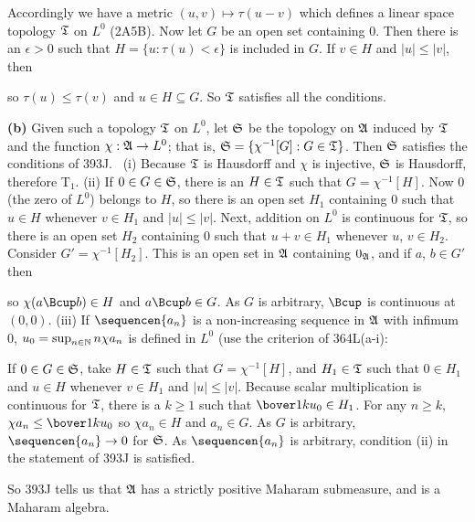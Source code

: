 {\medskip

 Accordingly we have a metric $(u,v)\mapsto\tau(u-v)$ which
defines a linear space topology $\frak T$ on $L^0$ (2A5B).   Now let $G$
be an open set containing $0$.   Then there is an $\epsilon>0$ such that
$H=\{u:\tau(u)<\epsilon\}$ is included in $G$.   If $v\in H$ and
$|u|\le|v|$, then


\noindent so $\tau(u)\le\tau(v)$ and $u\in H\subseteq G$.   So $\frak T$
satisfies all the conditions.

\medskip

{\bf (b)} Given such a topology $\frak T$ on $L^0$,
let $\frak S$ be the topology on $\frak A$ induced
by $\frak T$ and the function
$\chi:\frak A\to L^0$;  that is, $\frak S=\{\chi^{-1}[G]:G\in\frak T\}$.
Then $\frak S$ satisfies the conditions of 393J.   \Prf\ (i) Because
$\frak T$ is Hausdorff and $\chi$ is injective, $\frak S$ is Hausdorff,
therefore T$_1$.
(ii) If $0\in G\in\frak S$, there is an $H\in\frak T$ such that
$G=\chi^{-1}[H]$.   Now $0$ (the zero of $L^0$) belongs to $H$, so there
is an open set $H_1$ containing $0$ such that $u\in H$ whenever
$v\in H_1$ and $|u|\le|v|$.
Next, addition on $L^0$ is continuous for $\frak T$,
so there is an open set $H_2$ containing $0$ such that $u+v\in H_1$
whenever $u$, $v\in H_2$.   Consider $G'=\chi^{-1}[H_2]$.   This is an
open set in $\frak A$ containing $0_{\frak A}$, and if $a$, $b\in G'$ then


\noindent so $\chi(a\Bcup b)\in H$ and $a\Bcup b\in G$.   As $G$ is
arbitrary, $\Bcup$ is continuous at $(0,0)$.   (iii) If
$\sequencen{a_n}$ is
a non-increasing sequence in $\frak A$ with infimum $0$,
$u_0=\sup_{n\in\Bbb N}n\chi a_n$ is defined in $L^0$ (use the criterion
of 364L(a-i):


\noindent If $0\in G\in\frak S$, take $H\in\frak T$ such that
$G=\chi^{-1}[H]$, and $H_1\in\frak T$ such that $0\in H_1$ and $u\in H$
whenever $v\in H_1$ and $|u|\le|v|$.   Because scalar multiplication is
continuous for $\frak T$, there is a $k\ge 1$ such that
$\bover1ku_0\in H_1$.   For any $n\ge k$,
$\chi a_n\le\bover1ku_0$ so $\chi a_n\in H$
and $a_n\in G$.   As $G$ is arbitrary, $\sequencen{a_n}\to 0$ for
$\frak S$.   As $\sequencen{a_n}$ is arbitrary, condition (ii) in
the statement of 393J is satisfied.\ \Qed

So 393J tells us that $\frak A$ has a strictly positive Maharam
submeasure, and is a Maharam algebra.
}%

